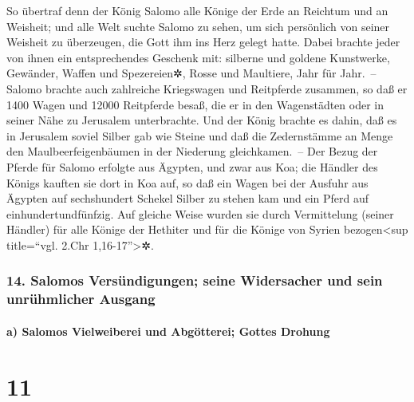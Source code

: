 So übertraf denn der König Salomo alle Könige der Erde an
Reichtum und an Weisheit; und alle Welt suchte Salomo zu
sehen, um sich persönlich von seiner Weisheit zu überzeugen, die Gott
ihm ins Herz gelegt hatte. Dabei brachte jeder von ihnen
ein entsprechendes Geschenk mit: silberne und goldene Kunstwerke,
Gewänder, Waffen und Spezereien✲, Rosse und Maultiere, Jahr für Jahr.~--
Salomo brachte auch zahlreiche Kriegswagen und Reitpferde
zusammen, so daß er 1400 Wagen und 12000 Reitpferde besaß, die er in den
Wagenstädten oder in seiner Nähe zu Jerusalem unterbrachte.
Und der König brachte es dahin, daß es in Jerusalem
soviel Silber gab wie Steine und daß die Zedernstämme an Menge den
Maulbeerfeigenbäumen in der Niederung gleichkamen.~-- Der
Bezug der Pferde für Salomo erfolgte aus Ägypten, und zwar aus Koa; die
Händler des Königs kauften sie dort in Koa auf, so daß
ein Wagen bei der Ausfuhr aus Ägypten auf sechshundert Schekel Silber zu
stehen kam und ein Pferd auf einhundertundfünfzig. Auf gleiche Weise
wurden sie durch Vermittelung (seiner Händler) für alle Könige der
Hethiter und für die Könige von Syrien bezogen\textless sup title=``vgl.
2.Chr 1,16-17''\textgreater✲.

\hypertarget{salomos-versuxfcndigungen-seine-widersacher-und-sein-unruxfchmlicher-ausgang}{%
\subsubsection{14. Salomos Versündigungen; seine Widersacher und sein
unrühmlicher
Ausgang}\label{salomos-versuxfcndigungen-seine-widersacher-und-sein-unruxfchmlicher-ausgang}}

\hypertarget{a-salomos-vielweiberei-und-abguxf6tterei-gottes-drohung}{%
\paragraph{a) Salomos Vielweiberei und Abgötterei; Gottes
Drohung}\label{a-salomos-vielweiberei-und-abguxf6tterei-gottes-drohung}}

\hypertarget{section-10}{%
\section{11}\label{section-10}}

